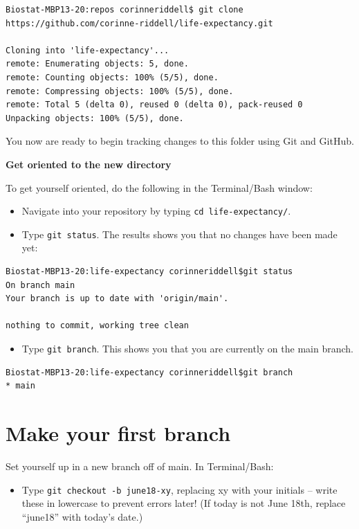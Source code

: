 \documentclass[
]{book}
\providecommand{\tightlist}{%
  \setlength{\itemsep}{0pt}\setlength{\parskip}{0pt}}
\begin{document}
\begin{verbatim}
Biostat-MBP13-20:repos corinneriddell$ git clone https://github.com/corinne-riddell/life-expectancy.git

Cloning into 'life-expectancy'...
remote: Enumerating objects: 5, done.
remote: Counting objects: 100% (5/5), done.
remote: Compressing objects: 100% (5/5), done.
remote: Total 5 (delta 0), reused 0 (delta 0), pack-reused 0
Unpacking objects: 100% (5/5), done.
\end{verbatim}

You now are ready to begin tracking changes to this folder using Git and GitHub.

\textbf{Get oriented to the new directory}

To get yourself oriented, do the following in the Terminal/Bash window:

\begin{itemize}
\tightlist
\item
  Navigate into your repository by typing \texttt{cd\ life-expectancy/}.
\item
  Type \texttt{git\ status}. The results shows you that no changes have been made yet:
\end{itemize}

\begin{verbatim}
Biostat-MBP13-20:life-expectancy corinneriddell$git status
On branch main
Your branch is up to date with 'origin/main'.

nothing to commit, working tree clean
\end{verbatim}

\begin{itemize}
\tightlist
\item
  Type \texttt{git\ branch}. This shows you that you are currently on the main branch.
\end{itemize}

\begin{verbatim}
Biostat-MBP13-20:life-expectancy corinneriddell$git branch
* main
\end{verbatim}

\section{Make your first branch}\label{make-your-first-branch}

Set yourself up in a new branch off of main. In Terminal/Bash:

\begin{itemize}
\tightlist
\item
  Type \texttt{git\ checkout\ -b\ june18-xy}, replacing xy with your initials -- write these
  in lowercase to prevent errors later! (If today is not June 18th, replace ``june18''
  with today's date.)
\end{itemize}
\end{document}

